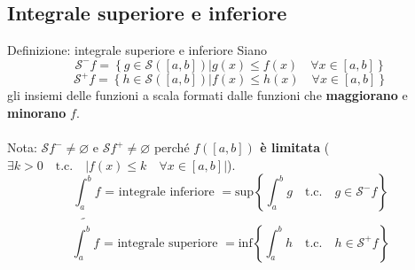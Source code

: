 \documentclass[x11names]{article}
\begin{document}
	\subsection{Integrale superiore e inferiore}
		\begin{center}
		\colorbox{myblue}{\begin{minipage}{5.75in}
				\begin{blues}{Definizione: integrale superiore e inferiore}
					Siano 
					\[
					\mathcal{S}^-f = \left\{g \in \mathcal{S}\left(\left[a,b\right]\right) | g(x) \leq f(x) \quad \forall x \in [a,b]\right\}
					\]
					\[
					\mathcal{S}^+f = \left\{h \in \mathcal{S}\left(\left[a,b\right]\right) | f(x) \leq h(x) \quad \forall x \in [a,b]\right\}
					\]
					gli insiemi delle funzioni a scala formati dalle funzioni che \textbf{maggiorano} e \textbf{minorano} $f$.\\ \\
					Nota: $\mathcal{S}f^- \neq \varnothing $ e $\mathcal{S}f^+ \neq \varnothing$ perché \textbf{$f([a,b])$ è limitata} ($\exists k > 0 \quad \text{t.c.} \quad |f(x) \leq k \quad \forall x \in [a,b]|$).
					\[
					\underline{\int_{a}^{b}}f \text{ = integrale inferiore } = \text{sup}\left\{\int_{a}^{b}g \quad \text{t.c.} \quad g \in \mathcal{S}^-f\right\}
					\]
					\[
					\overline{\int_{a}^{b}}f \text{ = integrale superiore } = \text{inf}\left\{\int_{a}^{b}h \quad \text{t.c.} \quad h \in \mathcal{S}^+f\right\}
					\]
				\end{blues}
		\end{minipage}}       
	\end{center}
	
\end{document}
